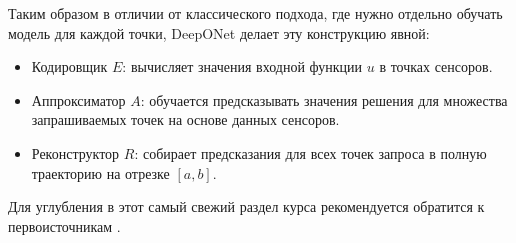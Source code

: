 \documentclass[../NDCNNAI_main.tex]{subfiles}
\begin{document}
Таким образом в отличии от классического подхода, где нужно отдельно обучать модель для каждой точки, DeepONet делает эту конструкцию явной:
\begin{itemize}
    \item Кодировщик \(E\): вычисляет значения входной функции \(u\) в точках сенсоров.
    \item Аппроксиматор \(A\): обучается предсказывать значения решения для множества запрашиваемых точек на основе данных сенсоров.
    \item Реконструктор \(R\): собирает предсказания для всех точек запроса в полную траекторию на отрезке \([a, b]\).
\end{itemize}

Для углубления в этот самый свежий раздел курса рекомендуется обратится к первоисточникам \cite{Lu2021, Telgarsky2016, Hanin2019, Lanthaler2021}.
\end{document}
